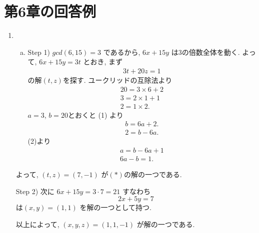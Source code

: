 \section{第6章の回答例} %
\begin{enumerate}[6.1] %
\item
  \begin{enumerate}[(a)]
    \item Step 1) $gcd(6, 15) = 3$ であるから, $6x + 15y$ は3の倍数全体を動く.
    よって, $6x + 15y = 3t$ とおき, まず
    \begin{align}
      3t + 20z = 1  \tag{$\ast$}
    \end{align}
    の解$(t, z)$を探す.
    ユークリッドの互除法より
    \begin{align}
      20 = 3 \times 6 + 2 \tag{1} \\
      3 = 2 \times 1 + 1  \tag{2} \\
      2 = 1 \times 2.  \tag{3}
    \end{align}
    $a = 3$, $b = 20$とおくと (1) より
    \begin{align*}
      b = 6a + 2. \\
      2 = b - 6a.
    \end{align*}
    (2)より
    \begin{align*}
      a = b - 6a + 1 \\
      6a - b = 1.
    \end{align*}
  \end{enumerate}
  よって, $(t, z) = (7, -1)$ が$(\ast)$の解の一つである.

  Step 2) 次に $6x + 15y = 3 \cdot 7 = 21$ すなわち
  \[
    2x + 5y = 7
  \]
  は$(x, y) = (1, 1)$ を解の一つとして持つ.

  以上によって, $(x, y, z) = (1, 1, -1)$ が解の一つである.
\end{enumerate} %

